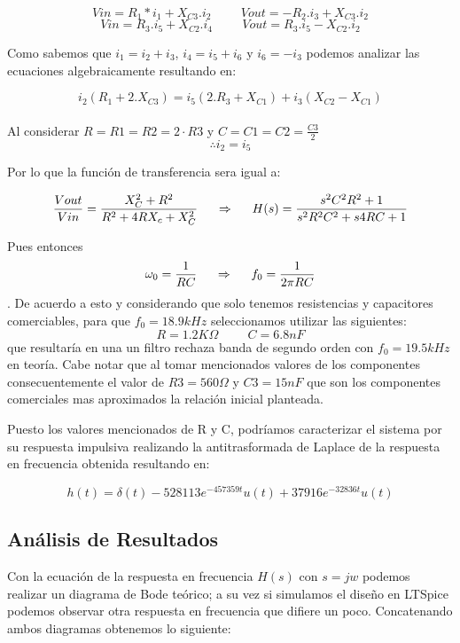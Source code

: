 $$Vin = R_1 *i_1 + X_{C3}.i_2 \hspace{1cm} Vout = -R_2 .i_3 + X_{C3}.i_2$$
$$Vin = R_3 .i_5 + X_{C2}.i_4 \hspace{1cm} Vout = R_3 .i_5 - X_{C2}.i_2$$

Como sabemos que $i_1 = i_2 + i_3$, $i_4 = i_5 + i_6$ y $i_6 = - i_3$ podemos analizar las ecuaciones algebraicamente resultando en:

$$i_2 (R_1 + 2.X_{C3}) = i_5 (2.R_3+X_{C1}) + i_3 (X_{C2} - X_{C1})$$\\


Al considerar $R = R1 = R2 = 2 \cdot R3$ y $C = C1 = C2 = \frac{C3}{2}$ 
$$\therefore i_2 = i_5$$

Por lo que la función de transferencia sera igual a:

$$\frac{Vout}{Vin} = \frac{X_C^2 + R^2}{R^2 + 4RX_c + X_C^2} \hspace{0.5cm}\Rightarrow \hspace{0.5cm} H(s) = \frac{s^2C^2R^2 + 1}{s^2R^2C^2 + s4RC + 1}$$

Pues entonces $$\omega_0 = \frac{1}{RC} \hspace{0.5cm} \Rightarrow \hspace{0.5cm} f_0 = \frac{1}{2\pi RC}$$. De acuerdo a esto y considerando que solo tenemos resistencias y capacitores comerciables, para que $f_0 = 18.9kHz$ seleccionamos utilizar las siguientes:
$$R = 1.2K\Omega \hspace{1cm} C = 6.8nF$$ que resultaría en una un filtro rechaza banda de segundo orden con $f_0 = 19.5kHz$ en teoría. 
Cabe notar que al tomar mencionados valores de los componentes consecuentemente el valor de $R3 = 560\Omega$ y $C3 = 15nF$ que son los componentes comerciales mas aproximados la relación inicial planteada.

Puesto los valores mencionados de R y C, podríamos caracterizar el sistema por su respuesta impulsiva realizando la antitrasformada de Laplace de la respuesta en frecuencia obtenida resultando en:

$$h(t) = \delta (t) - 528113e^{-457359t}u(t) + 37916e^{-32836t}u(t)$$



\subsection{Análisis de Resultados}

Con la ecuación de la respuesta en frecuencia $H(s)$ con $s=jw$ podemos realizar un diagrama de Bode teórico; a su vez si simulamos el diseño en LTSpice podemos observar otra respuesta en frecuencia que difiere un poco. Concatenando ambos diagramas obtenemos lo siguiente:


